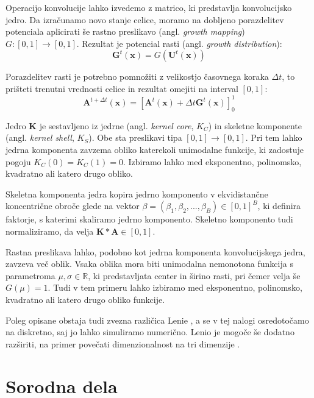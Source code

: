 \documentclass[a4paper, 12pt, openright]{book}
\begin{document}
Operacijo konvolucije lahko izvedemo z matrico, ki predstavlja konvolucijsko jedro. Da izračunamo novo stanje celice, moramo na dobljeno porazdelitev potenciala aplicirati še rastno preslikavo (angl. \textit{growth mapping}) \(G : [0, 1] \rightarrow [0, 1]\). Rezultat je potencial rasti (angl. \textit{growth distribution}):
\begin{equation}
    \mathbf{G}^t (\mathbf{x}) = G(\mathbf{U}^t (\mathbf{x}))
\end{equation}

Porazdelitev rasti je potrebno pomnožiti z velikostjo časovnega koraka \(\Delta t\), to prišteti trenutni vrednosti celice in rezultat omejiti na interval \([0, 1]\):
\begin{equation}
    \mathbf{A}^{t + \Delta t} (\mathbf{x}) = [\mathbf{A}^t (\mathbf{x}) + \Delta t \mathbf{G}^t (\mathbf{x})]_{0}^{1}
\end{equation}

Jedro \(\mathbf{K}\) je sestavljeno iz jedrne (angl. \textit{kernel core}, \(K_C\)) in skeletne komponente (angl. \textit{kernel shell}, \(K_S\)). Obe sta preslikavi tipa \([0, 1] \rightarrow [0, 1]\).
Pri tem lahko jedrna komponenta zavzema obliko katerekoli unimodalne funkcije, ki zadostuje pogoju \(K_C(0) = K_C(1) = 0\). Izbiramo lahko med eksponentno, polinomsko, kvadratno ali katero drugo obliko.

Skeletna komponenta jedra kopira jedrno komponento v ekvidistančne koncentrične obroče glede na vektor \(\beta = (\beta_1, \beta_2, ..., \beta_B) \in [0, 1]^B\), ki definira faktorje, s katerimi skaliramo jedrno komponento. Skeletno komponento tudi normaliziramo, da velja \(\mathbf{K} * \mathbf{A} \in [0, 1]\).

Rastna preslikava lahko, podobno kot jedrna komponenta konvolucijskega jedra, zavzeva več oblik. Vsaka oblika mora biti unimodalna nemonotona funkcija s parametroma \(\mu, \sigma \in \mathbb{R}\), ki predstavljata center in širino rasti, pri čemer velja še \(G(\mu) = 1\).
Tudi v tem primeru lahko izbiramo med eksponentno, polinomsko, kvadratno ali katero drugo obliko funkcije.

Poleg opisane obstaja tudi zvezna različica Lenie \cite{lenia}, a se v tej nalogi osredotočamo na diskretno, saj jo lahko simuliramo numerično. Lenio je mogoče še dodatno razširiti, na primer povečati dimenzionalnost na tri dimenzije \cite{lenia_expanded}.

\section{Sorodna dela}
\end{document}
